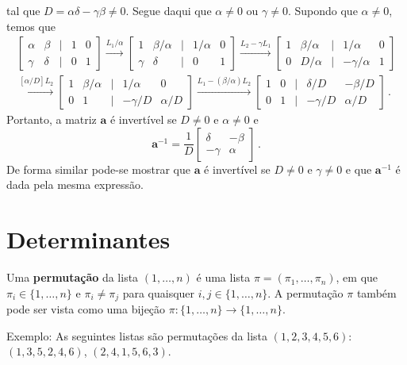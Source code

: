 \documentclass[12pt,a4paper]{report}
\newcommand{\tb}{\textbf}
\newcommand{\mb}{\mathbf}
\begin{document}
\begin{enumerate}
 tal que $D=\alpha\delta-\gamma\beta\ne 0$. Segue daqui que $\alpha\ne 0$ ou $\gamma\ne 0$. Supondo que $\alpha\ne 0$, temos que
 \begin{multline*}
   \begin{bmatrix}
     \alpha&\beta&|&1&0\\
     \gamma&\delta&|&0&1
   \end{bmatrix}\xrightarrow{L_1/\alpha}\begin{bmatrix}
     1&\beta/\alpha&|&1/\alpha&0\\
     \gamma&\delta&|&0&1
   \end{bmatrix}\xrightarrow{L_2-\gamma L_1}\begin{bmatrix}
     1&\beta/\alpha&|&1/\alpha&0\\
     0&D/\alpha&|&-\gamma/\alpha&1
   \end{bmatrix}\\
   \xrightarrow{[\alpha/D]L_2}\begin{bmatrix}
     1&\beta/\alpha&|&1/\alpha&0\\
     0&1&|&-\gamma/D&\alpha/D
   \end{bmatrix}\xrightarrow{L_1-(\beta/\alpha)L_2}\begin{bmatrix}
     1&0&|&\delta/D&-\beta/D\\
     0&1&|&-\gamma/D&\alpha/D
   \end{bmatrix}\,.
 \end{multline*}
 Portanto, a matriz $\mb a$ é invertível se $D\ne 0$ e $\alpha\ne 0$ e
 $$\mb a^{-1}=\frac{1}{D}\begin{bmatrix}
   \delta&-\beta\\
   -\gamma&\alpha
 \end{bmatrix}\,.$$
 De forma similar pode-se mostrar que $\mb a$ é invertível se $D\ne 0$ e $\gamma\ne 0$ e que $\mb a^{-1}$ é dada pela mesma expressão.
\end{enumerate}

\chapter{Determinantes}

Uma \tb{permutação} da lista $(1,\ldots,n)$ é uma lista $\pi=(\pi_1,\ldots,\pi_n)$, em que $\pi_i\in\{1,\ldots,n\}$ e $\pi_{i}\ne \pi_j$ para quaisquer $i,j\in\{1,\ldots,n\}$. A permutação $\pi$ também pode ser vista como uma bijeção $\pi:\{1,\ldots,n\}\to\{1,\ldots,n\}$.

Exemplo: As seguintes listas são permutações da lista $(1,2,3,4,5,6)$: $(1,3,5,2,4,6)$, $(2,4,1,5,6,3)$.
\end{document}
